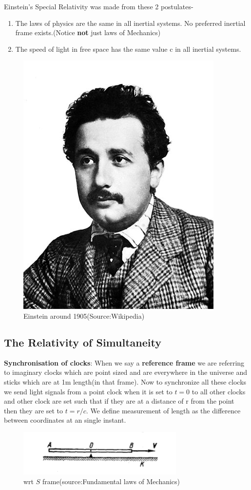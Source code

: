 \documentclass[12pt,a4paper]{article}
\numberwithin{table}{section}
\numberwithin{figure}{section}
\numberwithin{equation}{section}
\theoremstyle{remark}
\theoremstyle{definition}
\begin{document}
Einstein's Special Relativity was made from these 2 postulates- 
\begin{enumerate}
  \item The laws of physics are the same in all inertial systems. No preferred 
inertial frame exists.(Notice \textbf{not} just laws of Mechanics) 

  \item The speed of light in free space has the same value c in all inertial 
systems. 

\end{enumerate}
\begin{figure}[H]
    \centering
  \includegraphics[scale=0.25]{Einstein}
  \caption{Einstein around 1905(Source:Wikipedia)}
  \label{fig:Einstein}
\end{figure}

\subsection{The Relativity of Simultaneity}
\textbf{Synchronisation of clocks}: When we say a \textbf{reference frame} we are referring to imaginary clocks which are point sized and are everywhere in the universe and sticks which are at 1m length(in that frame). Now to synchronize all these clocks we send light signals from a point clock when it is set to $t=0$ to all other clocks and other clock are set such that if they are at a distance of r from the point then they are set to $t=r/c$.
We define measurement of length as the difference between coordinates at an single instant.
\begin{figure}[H]
    \centering
  \includegraphics[scale=1]{2}
  \caption{wrt $S$ frame(source:Fundamental laws of Mechanics)}
  \label{fig:2}
\end{figure}
\end{document}
